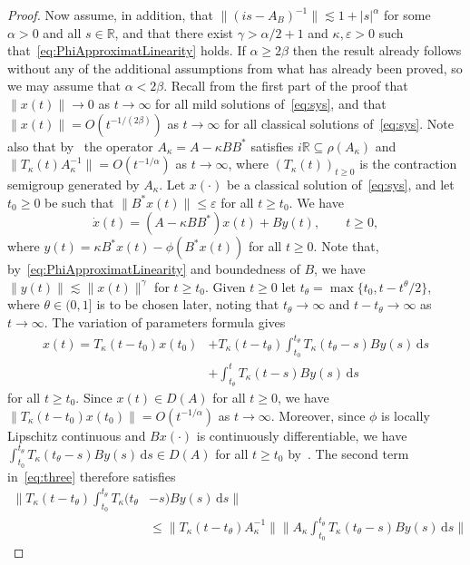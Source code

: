 \documentclass[10pt,a4paper]{amsart}
\newcommand{\RR}{\mathbb{R}}
\newcommand{\dd}{\mathrm{d}}
\newcommand{\ep}{\varepsilon}
\newcommand{\inv}{^{-1}}
\begin{document}
\begin{proof}
Now assume, in addition, that
$\|(is-A_B)\inv\|\lesssim 1+|s|^\alpha$ for some $\alpha>0$ and all $s\in\RR$, and that
 there exist $\gamma>\alpha/2+1$ and $\kappa,\ep>0$ such that~\eqref{eq:PhiApproximatLinearity} holds. If $\alpha\ge 2\beta$ then the result already follows without any of the additional assumptions from what has already been proved, so we may assume that $\alpha<2\beta$. Recall from the first part of the proof that $\|x(t)\|\to0$ as $t\to\infty$ for all  mild solutions of~\eqref{eq:sys}, and that $\|x(t)\|=O(t^{-1/(2\beta)})$ as $t\to\infty$ for all classical solutions of~\eqref{eq:sys}. Note also that by~\cite[Lem.~2.11(c)]{ChiPau23} the operator $A_\kappa = A-\kappa BB^\ast$ satisfies $i\RR\subseteq\rho(A_\kappa)$ and $\|T_\kappa(t)A_\kappa\inv\|=O(t^{-1/\alpha})$ as $t\to\infty$, where $(T_\kappa(t))_{t\ge0}$ is the contraction semigroup  generated by $A_\kappa$. Let $x(\cdot)$ be a classical solution of~\eqref{eq:sys}, and let $t_0\ge0$ be such that $\|B^*x(t)\|\le\ep$ for all $t\ge t_0$.  We have
 $$\dot{x}(t)=(A-\kappa BB^\ast) x(t) + By(t),\qquad t\ge 0,$$
 where $y(t)=\kappa B^\ast x(t)-\phi(B^\ast x(t))$ for all $t\ge 0$. Note that, by~\eqref{eq:PhiApproximatLinearity} and boundedness of $B$, we have $\|y(t)\|\lesssim \| x(t)\|^{\gamma}$ for $t\ge t_0$. Given $t\ge0$ let $t_\theta=\max\{t_0,t-t^\theta/2\}$, where $\theta\in(0,1]$ is to be chosen later, noting that $t_\theta\to\infty$ and $t-t_\theta\to\infty$ as $t\to\infty$. The variation of parameters formula gives
 \begin{equation}\label{eq:three}
 \begin{aligned}
 x(t)
 = T_\kappa (t-t_0)x(t_0) 
&+ T_\kappa (t-t_\theta)\int_{t_0}^{t_\theta} T_\kappa (t_\theta-s)By(s)\,\dd s\\
\qquad &+ \int_{t_\theta}^t T_\kappa (t-s)By(s)\,\dd s
 \end{aligned}
 \end{equation}
for all $t\ge t_0$.  Since $x(t)\in D(A)$ for all $t\ge 0$, we have  $\|T_\kappa (t-t_0)x(t_0)\| =O(  t^{-1/\alpha})$ as $t\to\infty$. 
 Moreover, since $\phi$ is locally Lipschitz continuous and $Bx(\cdot)$ is continuously differentiable, we have $\int_{t_0}^{t_\theta} T_\kappa (t_\theta-s)By(s)\,\dd s\in D(A)$ for all $t\ge t_0$ by~\cite[Cor.~3.1.17]{AreBat11book}.
The second term in~\eqref{eq:three} therefore satisfies
$$\begin{aligned}
\bigg\|T_\kappa (t-t_\theta)\int_{t_0}^{t_\theta} T_\kappa (t_\theta&-s)By(s)\,\dd s\bigg\|\\ &\le\|T_\kappa (t-t_\theta)A_\kappa\inv\|\bigg\|A_\kappa\int_{t_0}^{t_\theta} T_\kappa (t_\theta-s)By(s)\,\dd s\bigg\|

\end{aligned}$$
\end{proof}
\end{document}
